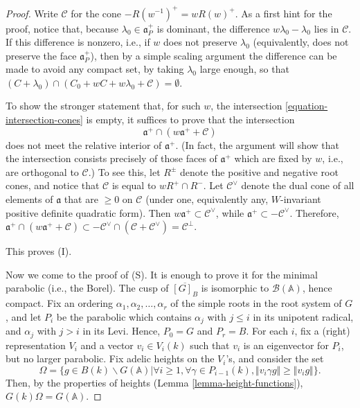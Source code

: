 \begin{proof}
Write $\mathcal C$ for the cone $-R(w^{-1})^+=wR(w)^+$. As a first hint for the proof, notice that, because $\lambda_0 \in \mathfrak a_P^+$ is dominant, the difference $w\lambda_0 -\lambda_0$ lies in $\mathcal C$. If this difference is nonzero, i.e., if $w$ does not preserve $\lambda_0$ (equivalently, does not preserve the face $\mathfrak a_P^+$), then by a simple scaling argument the difference can be made to avoid any compact set, by taking $\lambda_0$ large enough, so that $(C+\lambda_0) \cap  (C_0 + wC+ w\lambda_0 + \mathcal C) = \emptyset$.

To show the stronger statement that, for such $w$, the intersection \eqref{equation-intersection-cones} is empty, it suffices to prove that the intersection 
$$ {\mathfrak a}^+ \cap  (w\mathfrak a^+ + \mathcal C)$$
does not meet the relative interior of $\mathfrak a^+$. (In fact, the argument will show that the intersection consists precisely of those faces of $\mathfrak a^+$ which are fixed by $w$, i.e., are orthogonal to $\mathcal C$.) To see this, let $R^\pm$ denote the positive and negative root cones, and notice that $\mathcal C$ is equal to $wR^+\cap R^-$. Let $\mathcal C^\vee$ denote the dual cone of all elements of $\mathfrak a$ that are $\ge 0$ on $\mathcal C$ (under one, equivalently any, $W$-invariant positive definite quadratic form). Then $w\mathfrak a^+ \subset \mathcal C^\vee$, while $\mathfrak a^+\subset -\mathcal C^\vee$. Therefore, $ {\mathfrak a}^+ \cap  (w\mathfrak a^+ +\mathcal C )\subset  -\mathcal C^\vee \cap (\mathcal C +\mathcal C^\vee) = \mathcal C^\perp$.







This proves (I).

 
Now we come to the proof of (S). It is enough to prove it for the minimal parabolic (i.e., the Borel). The cusp of $\overline{[G]_B}$ is isomorphic to $\mathcal B(\mathbb A)$, hence compact. Fix an ordering $\alpha_1, \alpha_2, \dots,\alpha_r$ of the simple roots in the root system of $G$, and let $P_i$ be the parabolic which contains $\alpha_j$ with $j\le i$ in its unipotent radical, and $\alpha_j$ with $j>i$ in its Levi. Hence, $P_0=G$ and $P_r=B$. For each $i$, fix a (right) representation $V_i$ and a vector $v_i \in V_i(k)$ such that $v_i$ is an eigenvector for $P_i$, but no larger parabolic. Fix adelic heights on the $V_i$'s, and consider the set 
 $$ \Omega = \{g \in B(k)\backslash G(\mathbb A) | \forall i \ge 1, \forall \gamma \in P_{i-1}(k), \Vert v_i \gamma g \Vert \ge \Vert  v_i g\Vert\}.$$
 Then, by the properties of heights (Lemma \ref{lemma-height-functions}), $G(k)\Omega = G(\mathbb A)$. 
 

\end{proof}

